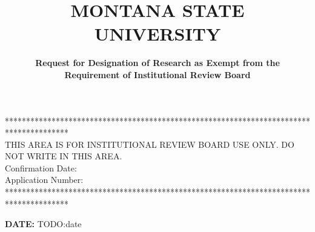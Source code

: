 \documentclass{article}
\newcommand{\response}[1]{{\color{blue}#1}}
\begin{document}
\title{\bf MONTANA STATE UNIVERSITY}
\author{\bf Request for Designation of Research as Exempt from the\\
    \bf Requirement of Institutional Review Board
}
\date{}

\maketitle

\begin{center}
    ***************************************************************************************
    \\
    \small
    THIS AREA IS FOR INSTITUTIONAL REVIEW BOARD USE ONLY. DO NOT WRITE IN THIS
    AREA.\\
    \hspace{-4in} Confirmation Date: \\
    \hspace{-4in}    Application Number:\\
    ***************************************************************************************
\end{center}

\noindent
{\bf DATE:} \response{TODO:date}
\end{document}
